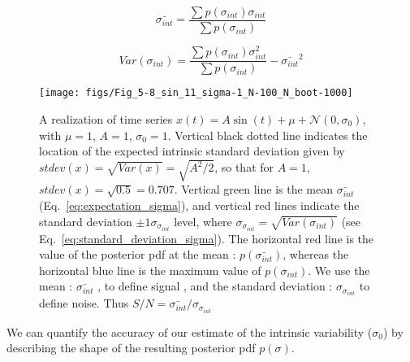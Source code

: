 \documentclass[fleqn,usenatbib]{mnras}  %
\begin{document}
\begin{equation}
\bar{\sigma_{int}} = \frac{\sum{p(\sigma_{int})\sigma_{int}}}{\sum{p(\sigma_{int})}}
\end{equation}

\begin{equation}
Var(\sigma_{int}) =  \frac{\sum{p(\sigma_{int})\sigma_{int}^{2}}}{\sum{p(\sigma_{int})}} - \bar{\sigma_{int}}^{2}
\end{equation}



\begin{figure*}
\texttt{[image: figs/Fig\_5-8\_sin\_11\_sigma-1\_N-100\_N\_boot-1000]}
\caption{A realization of time series $x(t) = A \sin{(t)}+\mu+\mathcal{N}(0,\sigma_{0})$, with $\mu=1$, $A=1$, $\sigma_{0}=1$. Vertical black dotted line indicates the location of the expected intrinsic standard deviation given by  $stdev(x) = \sqrt{Var(x)} = \sqrt{A^{2}/2}$, so that for $A=1$,  $stdev(x) = \sqrt{0.5} = 0.707$. Vertical green line is  the mean $\bar{\sigma_{int}}$  (Eq.~\ref{eq:expectation_sigma}), and vertical red lines indicate the  standard deviation $\pm 1 \sigma_{\sigma_{int}}$ level, where $\sigma_{\sigma_{int}} = \sqrt{Var(\sigma_{int})}$  (see Eq.~\ref{eq:standard_deviation_sigma}). The horizontal red line is the value of the posterior pdf at the mean : $p(\bar{\sigma_{int}})$, whereas the horizontal blue line is the maximum value of $p(\sigma_{int})$. We use the mean : $\bar{\sigma_{int}}$ , to define signal , and  the standard deviation : $\sigma_{\sigma_{int}}$ to define noise.  Thus $S/N =  \bar{\sigma_{int}} / \sigma_{\sigma_{int}}$}
\label{fig:time_series_test}
\end{figure*}


We can quantify the accuracy of our estimate of the intrinsic variability ($\sigma_{0}$) by describing the shape of the resulting posterior pdf $p(\sigma)$. 
\end{document}
